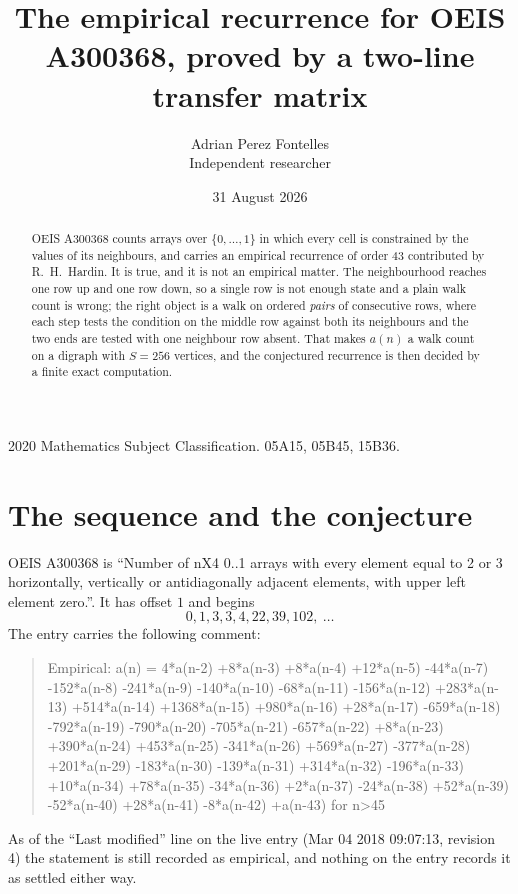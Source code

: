 \documentclass[11pt,a4paper]{article}
\title{The empirical recurrence for OEIS A300368, proved by a two-line transfer matrix}
\author{Adrian Perez Fontelles\\ \small Independent researcher}
\date{31 August 2026}
\theoremstyle{plain}
\theoremstyle{definition}
\begin{document}
\maketitle

\begin{abstract}
OEIS A300368 counts arrays over $\{0,\dots,1\}$ in which every cell is constrained by the
values of its neighbours, and carries an empirical recurrence of order $43$ contributed
by R.~H.~Hardin. It is true, and it is not an empirical matter. The neighbourhood reaches one
row up and one row down, so a single row is not enough state and a plain walk count
is wrong; the right object is a walk on ordered \emph{pairs} of consecutive rows, where
each step tests the condition on the middle row against both its neighbours and the two
ends are tested with one neighbour row absent. That makes $a(n)$ a walk count on a digraph
with $S=256$ vertices, and the conjectured recurrence is then decided by a finite exact
computation.
\end{abstract}

\noindent\small 2020 Mathematics Subject Classification. 05A15, 05B45, 15B36.\normalsize

\section{The sequence and the conjecture}

OEIS A300368 is ``Number of nX4 0..1 arrays with every element equal to 2 or 3 horizontally, vertically or antidiagonally adjacent elements, with upper left element zero.''. It has offset $1$ and begins
\[
0, 1, 3, 3, 4, 22, 39, 102,\ \dots
\]
The entry carries the following comment:
\begin{quote}\small
Empirical: a(n) = 4*a(n-2) +8*a(n-3) +8*a(n-4) +12*a(n-5) -44*a(n-7) -152*a(n-8) -241*a(n-9) -140*a(n-10) -68*a(n-11) -156*a(n-12) +283*a(n-13) +514*a(n-14) +1368*a(n-15) +980*a(n-16) +28*a(n-17) -659*a(n-18) -792*a(n-19) -790*a(n-20) -705*a(n-21) -657*a(n-22) +8*a(n-23) +390*a(n-24) +453*a(n-25) -341*a(n-26) +569*a(n-27) -377*a(n-28) +201*a(n-29) -183*a(n-30) -139*a(n-31) +314*a(n-32) -196*a(n-33) +10*a(n-34) +78*a(n-35) -34*a(n-36) +2*a(n-37) -24*a(n-38) +52*a(n-39) -52*a(n-40) +28*a(n-41) -8*a(n-42) +a(n-43) for n>45
\end{quote}
As of the ``Last modified'' line on the live entry (Mar 04 2018 09:07:13, revision 4) the statement is
still recorded as empirical, and nothing on the entry records it as settled either way.
\end{document}
